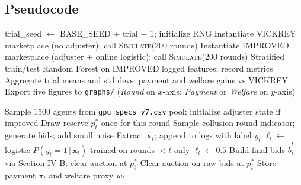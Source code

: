 \documentclass[journal]{IEEEtran}
\begin{document}
\subsection{Pseudocode}
\begin{algorithm}[t]
\caption{Main Simulation Procedure}
\begin{algorithmic}[1]
    \State trial\_seed $\gets$ BASE\_SEED $+$ trial $-$ 1; initialize RNG
    \State Instantiate VICKREY marketplace (no adjuster); call \textsc{Simulate}(200 rounds)
    \State Instantiate IMPROVED marketplace (adjuster + online logistic); call \textsc{Simulate}(200 rounds)
    \State {}
    \State Stratified train/test Random Forest on IMPROVED logged features; record metrics
\EndFor
\State Aggregate trial means and std devs; payment and welfare gains vs VICKREY
\State Export five figures to \texttt{graphs/} (\emph{Round} on $x$-axis; \emph{Payment} or \emph{Welfare} on $y$-axis)
\end{algorithmic}
\end{algorithm}

\begin{algorithm}[t]
\caption{\textsc{Simulate} (one marketplace instance)}
\begin{algorithmic}[1]
\State Sample 1500 agents from \texttt{gpu\_specs\_v7.csv} pool; initialize adjuster state if improved
    \State Draw reserve $p_t^\ast$ once for this round
    \State Sample collusion-round indicator; generate bids; add small noise
    \State Extract $\mathbf{x}_t$; append to logs with label $y_t$
            \State $\ell_t \gets$ logistic $P(y_t{=}1\,|\,\mathbf{x}_t)$ trained on rounds ${<}t$ only
        \Else
            \State $\ell_t \gets 0.5$
        \EndIf
        \State Build final bids $\tilde{b}_i^t$ via Section IV-B; clear auction at $p_t^\ast$
    \Else
        \State Clear auction on raw bids at $p_t^\ast$
    \EndIf
    \State Store payment $\pi_t$ and welfare proxy $w_t$
\EndFor
\end{algorithmic}
\end{algorithm}
\end{document}
